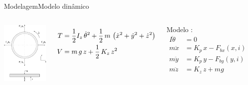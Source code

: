 \documentclass{beamer}
\begin{document}
\begin{frame}{Modelagem}{Modelo dinâmico}
\begin{columns}
\centering
 	\includegraphics[width=0.9\linewidth]{Modelagem/forcas}

	 \begin{align*}
 	 T &= \frac{1}{2} I_z \, \dot{\theta}^2 + \frac{1}{2} \, m \, \left( \dot{x}^2 + \dot{y}^2 + \dot{z}^2 \right) \notag \\
 	 V &= m \, g \, z + \frac{1}{2} \, K_z \, z^2
 	 \end{align*}
 	 
 	Modelo : 
	\begin{align*}
 	I \ddot{\theta} &= 0 \\
 	m \ddot{x}		&= K_p \, x  - F_{bx}(x,i) \\
 	m \ddot{y}		&= K_p \, y  - F_{by}(y,i) \\	
 	m \ddot{z}  	&= K_z \, z + m g 
 	\end{align*}	 	 

\end{columns}	 	
\end{frame}
\end{document}
